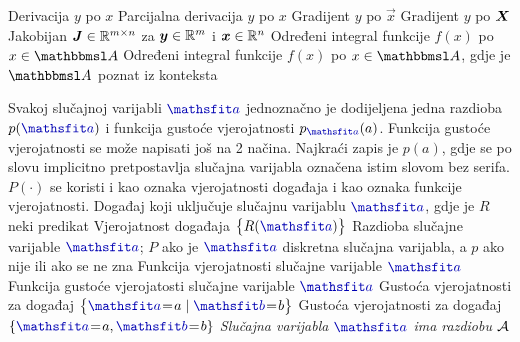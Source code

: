  				{Derivacija $y$ po $x$}
 				{Parcijalna derivacija $y$ po $x$}
 	{Gradijent $y$ po $\vec x$}
	{Gradijent $y$ po $\mat X$}
 	{Jakobijan $\mat J\in \R^{m\times n}$ za $\vec y\in\R^m$ i $\vec x\in\R^n$}
 {Određeni integral funkcije $f(x)$ po $x\in\set A$}
 {Određeni integral funkcije $f(x)$ po $x\in\set A$, gdje je $\set A$ poznat iz konteksta}

{Svakoj slučajnoj varijabli $\rvar a$ jednoznačno je dodijeljena jedna razdioba $p(\rvar a)$ i funkcija gustoće vjerojatnosti $p_{\rvar a}(a)$. Funkcija gustoće vjerojatnosti se može napisati još na 2 načina. Najkraći  zapis je $p(a)$, gdje se po slovu implicitno pretpostavlja slučajna varijabla označena istim slovom bez serifa. $P(\cdot)$ se koristi i kao oznaka vjerojatnosti događaja i kao oznaka funkcije vjerojatnosti.}
 {Događaj koji uključuje slučajnu varijablu $\rvar a$, gdje je $R$ neki predikat}
 {Vjerojatnost događaja $\cbr{R(\rvar a)}$}
 {Razdioba slučajne varijable $\rvar a$; $P$ ako je $\rvar a$ diskretna slučajna varijabla, a $p$ ako nije ili ako se ne zna}
 {Funkcija vjerojatnosti slučajne varijable $\rvar a$}
 {Funkcija gustoće vjerojatosti slučajne varijable $\rvar a$}
 {Gustoća vjerojatnosti za događaj $\cbr{\rvar a\sheq a\mid\rvar b\sheq b}$}
 {Gustoća vjerojatnosti za događaj $\cbr{\rvar a\sheq a,\rvar b\sheq b}$}
 {\textit{Slučajna varijabla $\rvar a$ ima razdiobu $\mathcal{A}$}}
